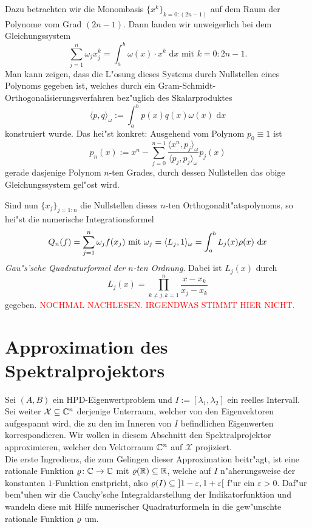 Dazu betrachten wir die Monombasis $\{x^k\}_{k=0:(2n-1)}$ auf dem Raum der Polynome vom
Grad $(2n-1)$. Dann landen wir unweigerlich bei dem
Gleichungssystem
\[
\sum_{j=1}^n \omega_j x_j^k = \int_a^b \omega(x)\cdot x^k \text{ d}x \text{ mit } k = 0:2n-1.
\]
Man kann zeigen, dass die L"osung dieses Systems durch Nullstellen eines Polynoms gegeben ist, welches durch
ein Gram-Schmidt-Orthogonalisierungsverfahren bez"uglich des Skalarproduktes
\[
\langle p,q\rangle_\omega := \int_a^b p(x) q(x)\omega(x) \text{ d}x
\]
konstruiert wurde. Das hei"st konkret: Ausgehend vom Polynom $p_0 \equiv 1$ ist
\[
p_n(x) := x^n - \sum_{j=0}^{n-1} \frac{\langle x^n, p_j \rangle_\omega}{\langle p_j, p_j\rangle_\omega} p_j (x)
\]
gerade dasjenige Polynom $n$-ten Grades, durch dessen Nullstellen das obige Gleichungssystem gel"ost wird.

\newpage

Sind nun $\{x_j\}_{j=1:n}$ die Nullstellen dieses $n$-ten Orthogonalit"atspolynoms, so hei"st die numerische Integrationsformel
\[
Q_n(f) = \sum_{j=1}^n \omega_j f(x_j) \text{ mit }
\omega_j = \langle L_j, 1 \rangle_\omega
= \int_a^b L_j(x)\rho(x)\text{ d}x
\]
\emph{Gau"s'sche Quadraturformel der $n$-ten Ordnung}.
Dabei ist $L_j (x)$ durch
\[
L_j(x) = \prod_{k\neq j, k=1}^n \frac{x-x_k}{x_j - x_k}
\]
gegeben. \textcolor{red}{NOCHMAL NACHLESEN. IRGENDWAS STIMMT HIER NICHT.}

\section{Approximation des Spektralprojektors}

Sei $(A,B)$ ein HPD-Eigenwertproblem und $I:=[\lambda_1, \lambda_2]$ ein reelles Intervall. Sei weiter $\mathcal{X}\subseteq\mathbb{C}^n$ derjenige Unterraum, welcher von den Eigenvektoren aufgespannt wird, die zu den im Inneren von $I$ befindlichen Eigenwerten korrespondieren. Wir wollen in diesem Abschnitt den Spektralprojektor approximieren, welcher den Vektorraum $\mathbb{C}^n$ auf $\mathcal{X}$ projiziert.\\

Die erste Ingredienz, die zum Gelingen dieser Approximation beitr"agt, ist eine rationale Funktion $\varrho\colon\mathbb{C}\to\mathbb{C}$ mit $\varrho(\mathbb{R}) \subseteq \mathbb{R}$, welche auf $I$ n"aherungsweise der konstanten $1$-Funktion enstpricht, also $\r(I) \subseteq\ ]1-\varepsilon,1+\varepsilon[$ f"ur ein $\varepsilon > 0$.
Daf"ur bem"uhen wir die Cauchy'sche Integraldarstellung der Indikatorfunktion und
wandeln diese mit Hilfe numerischer Quadraturformeln in die gew"unschte
rationale Funktion $\varrho$ um.\\

